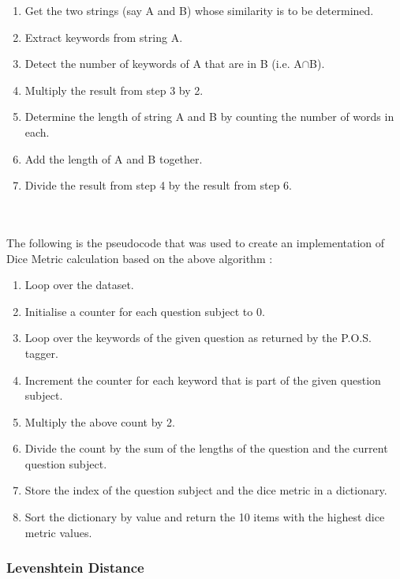 \documentclass[12pt, a4paper]{article}
\begin{document}
\begin{enumerate}
    \item  Get the two strings (say A and B) whose similarity is to be determined. 
    \item Extract keywords from string A. 
    \item Detect the number of keywords of A that are in B (i.e. A\(\cap\)B). 
    \item Multiply the result from step 3 by 2. 
    \item Determine the length of string A and B by counting the number of words in each. 
    \item Add the length of A and B together. 
    \item Divide the result from step 4 by the result from step 6. 
\end{enumerate}

\\~\\ 
The following is the pseudocode that was used to create an implementation of Dice Metric calculation based on the above algorithm : 

\begin{enumerate}
    \item Loop over the dataset. 
    \item Initialise a counter for each question subject to 0. 
    \item Loop over the keywords of the given question as returned by the P.O.S. tagger. 
    \item Increment the counter for each keyword that is part of the given question subject. 
    \item Multiply the above count by 2. 
    \item Divide the count by the sum of the lengths of the question and the current question subject. 
    \item Store the index of the question subject and the dice metric in a dictionary. 
    \item Sort the dictionary by value and return the 10 items with the highest dice metric values. 
\end{enumerate}

\subsubsection{Levenshtein Distance} 
\end{document}
